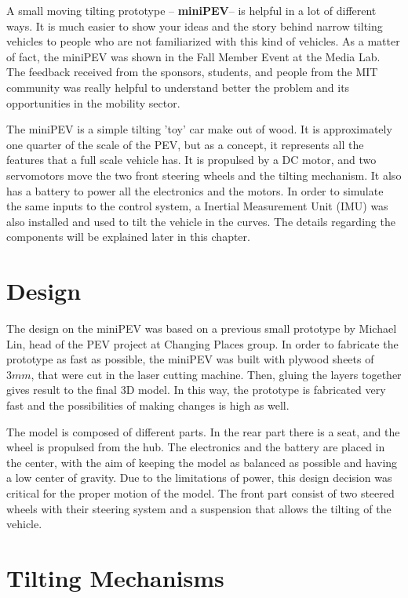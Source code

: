A small moving tilting prototype  -- \textbf{miniPEV}-- is helpful in a lot of different ways. It is much easier to show your ideas and the story behind narrow tilting vehicles to people who are not familiarized  with this kind of vehicles. As a matter of fact, the miniPEV was shown in the Fall Member Event at the Media Lab. The feedback received from the sponsors, students, and people from the MIT community was really helpful to understand better the problem and its opportunities in the mobility sector.

The miniPEV\cite{miniPEV} is a simple tilting 'toy' car make out of wood. It is approximately one quarter of the scale of the PEV, but as a concept, it represents all the features that a full scale vehicle has.
It is propulsed by a DC motor, and two servomotors move the two front steering wheels and the tilting mechanism. It also has a battery to power all the electronics and the motors. In order to simulate the same inputs to the control system, a Inertial Measurement Unit (IMU) was also installed and used to tilt the vehicle in the curves. The details regarding the components will be explained later in this chapter.



\newpage
\section{Design}

The design on the miniPEV was based on a previous small prototype by Michael Lin, head of the PEV project at Changing Places group. In order to fabricate the prototype as fast as possible, the miniPEV was built with plywood sheets of $3mm$, that were cut in the laser cutting machine. Then, gluing the layers together gives result to the final 3D model. In this way, the prototype is fabricated very fast and the possibilities of making changes is high as well.

The model is composed of different parts. In the rear part there is a seat, and the wheel is propulsed from the hub. The electronics and the battery are placed in the center, with the aim of keeping the model as balanced as possible and having a low center of gravity. Due to the limitations of power, this design decision was critical for the proper motion of the model. The front part consist of two steered wheels with their steering system and a suspension that allows the tilting of the vehicle.

\section{Tilting Mechanisms}


